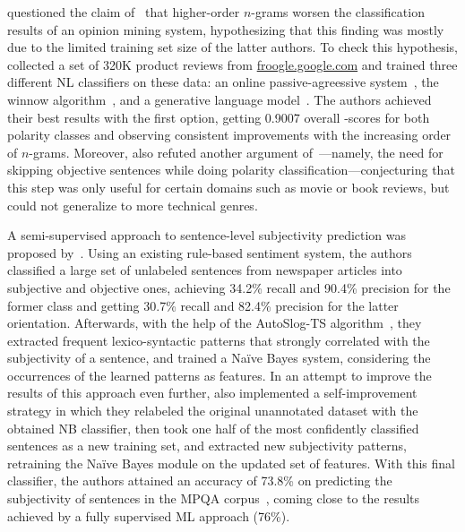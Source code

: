 
\citet{Cui:06} questioned the claim of~\citet{Pang:02} that
higher-order $n$-grams worsen the classification results of an opinion
mining system, hypothesizing that this finding was mostly due to the
limited training set size of the latter authors.  To check this
hypothesis, \citeauthor{Cui:06} collected a set of 320K product
reviews from \url{froogle.google.com} and trained three different NL
classifiers on these data: an online passive-agreessive
system~\cite{Crammer:06}, the winnow algorithm~\cite{Hurst:04}, and a
generative language model~\cite{Manning:99}.  The authors achieved
their best results with the first option, getting 0.9007 overall
\F-scores for both polarity classes and observing consistent
improvements with the increasing order of $n$-grams.  Moreover,
\citeauthor{Cui:06} also refuted another argument
of~\citet{Pang:04}---namely, the need for skipping objective sentences
while doing polarity classification---conjecturing that this step was
only useful for certain domains such as movie or book reviews, but
could not generalize to more technical genres.


A semi-supervised approach to sentence-level subjectivity prediction
was proposed by~\citet{Wiebe:05a}.  Using an existing rule-based
sentiment system, the authors classified a large set of unlabeled
sentences from newspaper articles into subjective and objective ones,
achieving 34.2\% recall and 90.4\% precision for the former class and
getting 30.7\% recall and 82.4\% precision for the latter orientation.
Afterwards, with the help of the AutoSlog-TS
algorithm~\cite{Riloff:96}, they extracted frequent lexico-syntactic
patterns that strongly correlated with the subjectivity of a sentence,
and trained a Na{\"i}ve Bayes system, considering the occurrences of
the learned patterns as features.  In an attempt to improve the
results of this approach even further, \citeauthor{Wiebe:05a} also
implemented a self-improvement strategy in which they relabeled the
original unannotated dataset with the obtained NB classifier, then
took one half of the most confidently classified sentences as a new
training set, and extracted new subjectivity patterns, retraining the
Na{\"i}ve Bayes module on the updated set of features.  With this
final classifier, the authors attained an accuracy of 73.8\% on
predicting the subjectivity of sentences in the MPQA
corpus~\cite{Wiebe:05}, coming close to the results achieved by a
fully supervised ML approach (76\%).

